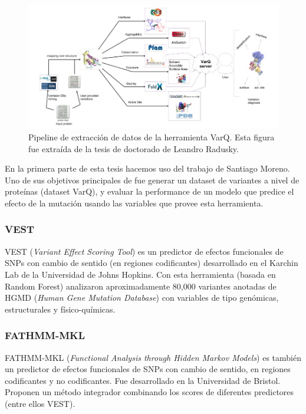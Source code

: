 \begin{figure}[H]
    \centering
    \includegraphics[scale=0.4]{documents/latex/figures/1/pipeline.png}
    \caption{Pipeline de extracción de datos de la herramienta VarQ. Esta figura fue extraída de la tesis de doctorado de Leandro Radusky.}
    \label{fig:varq_pipeline}
\end{figure}

En la primera parte de esta tesis hacemos uso del trabajo de Santiago Moreno. Uno de sus objetivos principales de fue generar un dataset de variantes a nivel de proteínas (dataset VarQ), y evaluar la performance de un modelo que predice el efecto de la mutación usando las variables que provee esta herramienta. 

\subsubsection{VEST \cite{Carter2013}}

VEST (\textit{Variant Effect Scoring Tool}) es un predictor de efectos funcionales de SNPs con cambio de sentido (en regiones codificantes) desarrollado en el Karchin Lab de la Universidad de Johns Hopkins. Con esta herramienta (basada en Random Forest) analizaron aproximadamente 80,000 variantes anotadas de HGMD (\textit{Human Gene Mutation Database}) con variables de tipo genómicas, estructurales y físico-químicas.

\subsubsection{FATHMM-MKL \cite{Shihab2015}}

FATHMM-MKL (\textit{Functional Analysis through Hidden Markov Models}) es también un predictor de efectos funcionales de SNPs con cambio de sentido, en regiones codificantes y no codificantes. Fue desarrollado en la Universidad de Bristol. Proponen un método integrador combinando los scores de diferentes predictores (entre ellos VEST).

